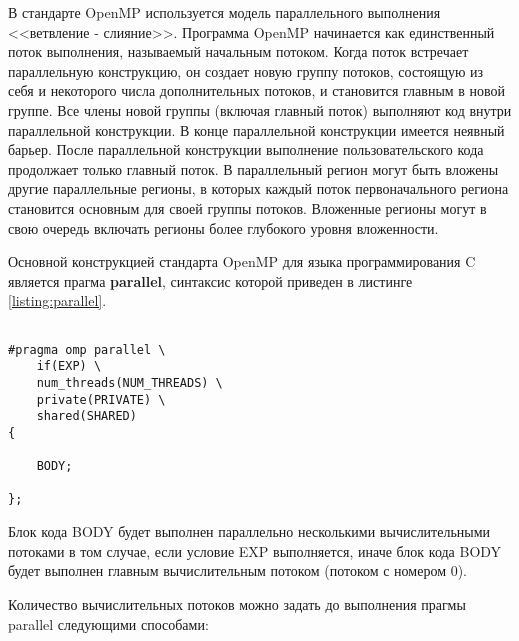 В стандарте OpenMP используется модель параллельного выполнения <<ветвление - слияние>>. Программа OpenMP начинается как единственный поток выполнения, называемый начальным потоком. Когда поток встречает параллельную конструкцию, он создает новую группу потоков, состоящую из себя и некоторого числа дополнительных потоков, и становится главным в новой группе. Все члены новой группы (включая главный поток) выполняют код внутри параллельной конструкции. В конце параллельной конструкции имеется неявный барьер. После параллельной конструкции выполнение пользовательского кода продолжает только главный поток. В параллельный регион могут быть вложены другие параллельные регионы, в которых каждый поток первоначального региона становится основным для своей группы потоков. Вложенные регионы могут в свою очередь включать регионы более глубокого уровня вложенности.

Основной конструкцией стандарта OpenMP для языка программирования C является прагма {\bf parallel}, синтаксис которой приведен в листинге \ref{listing:parallel}.

\begin{lstlisting}

#pragma omp parallel \
	if(EXP) \
	num_threads(NUM_THREADS) \
	private(PRIVATE) \
	shared(SHARED)
{

	BODY;

};

\end{lstlisting}
\mylistingend

Блок кода BODY будет выполнен параллельно несколькими вычислительными потоками в том случае, если условие EXP выполняется, иначе блок кода BODY будет выполнен главным вычислительным потоком (потоком с номером 0).

Количество вычислительных потоков можно задать до выполнения прагмы parallel следующими способами:

